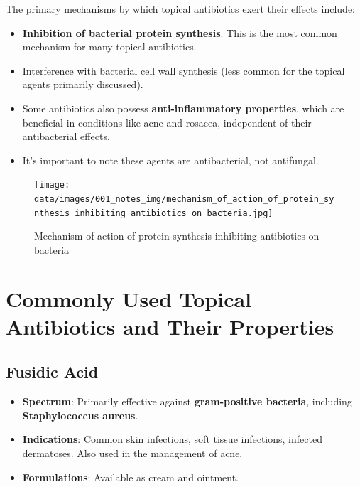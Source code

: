 \documentclass{article}
\begin{document}
The primary mechanisms by which topical antibiotics exert their effects include:
\begin{itemize}
    \item \textbf{Inhibition of bacterial protein synthesis}: This is the most common mechanism for many topical antibiotics.
    \item Interference with bacterial cell wall synthesis (less common for the topical agents primarily discussed).
    \item Some antibiotics also possess \textbf{anti-inflammatory properties}, which are beneficial in conditions like acne and rosacea, independent of their antibacterial effects.
    \item It's important to note these agents are antibacterial, not antifungal.
\end{itemize}

\begin{figure}[h]
    \centering
    \texttt{[image: data/images/001\_notes\_img/mechanism\_of\_action\_of\_protein\_synthesis\_inhibiting\_antibiotics\_on\_bacteria.jpg]}
    \caption{Mechanism of action of protein synthesis inhibiting antibiotics on bacteria}
    \label{fig:mechanism_of_action_of_protein_synthesis_inhibiting_antibiotics_on_bacteria}
\end{figure}

\section*{Commonly Used Topical Antibiotics and Their Properties}

\subsection*{\textbf{Fusidic Acid}}
\begin{itemize}
    \item \textbf{Spectrum}: Primarily effective against \textbf{gram-positive bacteria}, including \textbf{Staphylococcus aureus}.
    \item \textbf{Indications}: Common skin infections, soft tissue infections, infected dermatoses. Also used in the management of acne.
    \item \textbf{Formulations}: Available as cream and ointment.
\end{itemize}
\end{document}
